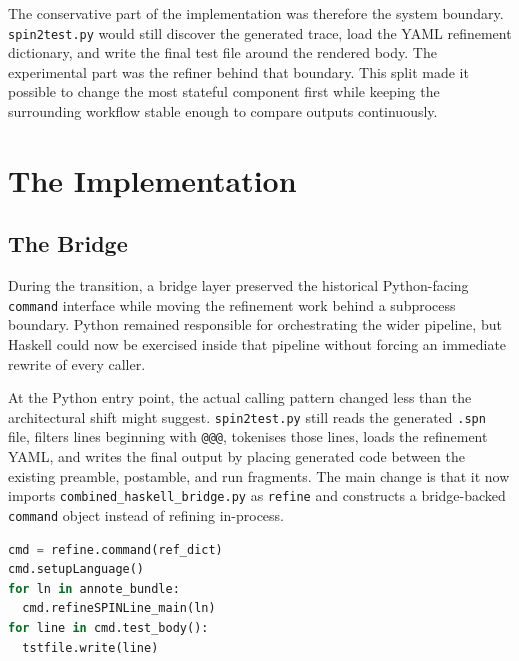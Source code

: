 The conservative part of the implementation was therefore the system
boundary. \texttt{spin2test.py} would still discover the generated
trace, load the YAML refinement dictionary, and write the final test
file around the rendered body. The experimental part was the refiner
behind that boundary. This split made it possible to change the most
stateful component first while keeping the surrounding workflow stable
enough to compare outputs continuously.

\section{The Implementation}

\subsection{The Bridge}


During the transition, a bridge layer preserved the historical
Python-facing \texttt{command} interface while moving the refinement
work behind a subprocess boundary. Python remained responsible for
orchestrating the wider pipeline, but Haskell could now be exercised
inside that pipeline without forcing an immediate rewrite of every
caller.

At the Python entry point, the actual calling pattern changed less
than the architectural shift might suggest. \texttt{spin2test.py}
still reads the generated \texttt{.spn} file, filters lines beginning
with \texttt{@@@}, tokenises those lines, loads the refinement YAML,
and writes the final output by placing generated code between the
existing preamble, postamble, and run fragments. The main change is
that it now imports \texttt{combined\_haskell\_bridge.py} as
\texttt{refine} and constructs a bridge-backed \texttt{command}
object instead of refining in-process.

\begin{lstlisting}[language=Python, caption={Python-side calling pattern preserved by the bridge}, label={lst:bridge-python-entry}]
cmd = refine.command(ref_dict)
cmd.setupLanguage()
for ln in annote_bundle:
  cmd.refineSPINLine_main(ln)
for line in cmd.test_body():
  tstfile.write(line)
\end{lstlisting}

